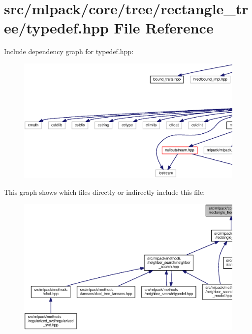 \section{src/mlpack/core/tree/rectangle\+\_\+tree/typedef.hpp File Reference}
\label{core_2tree_2rectangle__tree_2typedef_8hpp}
Include dependency graph for typedef.\+hpp\+:
\nopagebreak
\begin{figure}[H]
\begin{center}
\leavevmode
\includegraphics[width=350pt]{core_2tree_2rectangle__tree_2typedef_8hpp__incl}
\end{center}
\end{figure}
This graph shows which files directly or indirectly include this file\+:
\nopagebreak
\begin{figure}[H]
\begin{center}
\leavevmode
\includegraphics[width=350pt]{core_2tree_2rectangle__tree_2typedef_8hpp__dep__incl}
\end{center}
\end{figure}
